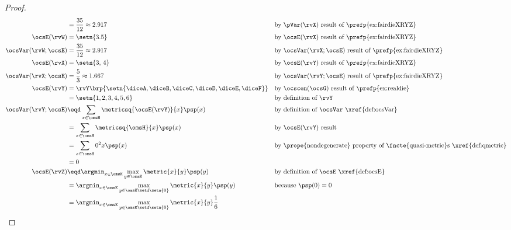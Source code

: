 \begin{tabstr}{0.75}
\begin{proof}
\begin{align*}
        &= \frac{35}{12}\approx 2.917
        && \text{by $\pVar(\rvX)$ result of \prefp{ex:fairdieXRYZ}}
      \\
      \ocsE(\rvW)
        &= \setn{3.5}
        && \text{by $\ocsE(\rvX)$ result of \prefp{ex:fairdieXRYZ}}
      \\
      \ocsVar(\rvW;\ocsE)
        &= \frac{35}{12} \approx 2.917
        && \text{by $\ocsVar(\rvX;\ocsE)$ result of \prefp{ex:fairdieXRYZ}}
      \\
      \ocsE(\rvX)
        &= \setn{3,\,4}
        && \text{by $\ocsE(\rvY)$ result of \prefp{ex:fairdieXRYZ}}
      \\
      \ocsVar(\rvX;\ocsE)
        &= \frac{5}{3} \approx 1.667
        && \text{by $\ocsVar(\rvY;\ocsE)$ result of \prefp{ex:fairdieXRYZ}}
      \\
      \ocsE(\rvY)
        &= \rvY\brp{\setn{\diceA,\diceB,\diceC,\diceD,\diceE,\diceF}}
        && \text{by $\ocscen(\ocsG)$ result of \prefp{ex:realdie}}
      \\&= \setn{1,2,3,4,5,6}
        && \text{by definition of $\rvY$}
      \\
      \ocsVar(\rvY;\ocsE)
        &\eqd \sum_{x\in\omsH}\metricsq{\ocsE(\rvY)}{x}\psp(x)
        && \text{by definition of $\ocsVar$ \xref{def:ocsVar}}
      \\&= \sum_{x\in\omsH}\metricsq{\omsH}{x}\psp(x)
        && \text{by $\ocsE(\rvY)$ result}
      \\&= \sum_{x\in\omsH}0^2{x}\psp(x)
        && \text{by \prope{nondegenerate} property of \fncte{quasi-metric}s \xref{def:qmetric}}
      \\&= 0
    \\
    \ocsE(\rvZ)
      &\eqd \argmin_{x\in\omsK}\max_{y\in\omsK}\metric{x}{y}\psp(y)
      &&\text{by definition of $\ocsE$ \xref{def:ocsE}}
    \\&= \argmin_{x\in\omsK}\max_{y\in\omsK\setd\setn{0}}\metric{x}{y}\psp(y)
      &&\text{because $\psp(0)=0$}
    \\&= \argmin_{x\in\omsK}\max_{y\in\omsK\setd\setn{0}}\metric{x}{y}\frac{1}{6}

\end{align*}
\end{proof}
\end{tabstr}
